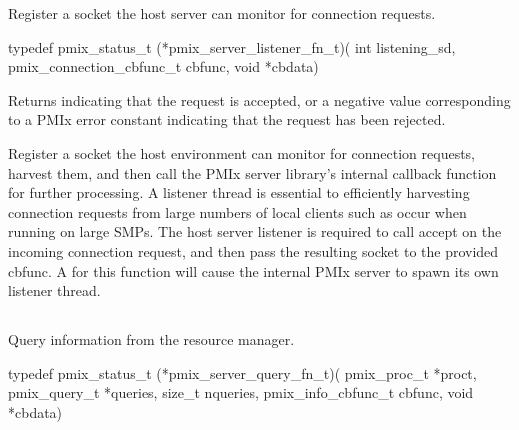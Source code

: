 \summary

Register a socket the host server can monitor for connection requests.

\format

\cspecificstart
\begin{codepar}
typedef pmix_status_t (*pmix_server_listener_fn_t)(
                             int listening_sd,
                             pmix_connection_cbfunc_t cbfunc,
                             void *cbdata)
\end{codepar}
\cspecificend

\begin{arglist}
\end{arglist}

Returns  indicating that the request is accepted, or a negative value corresponding to a PMIx error constant indicating that the request has been rejected.

\descr

Register a socket the host environment can monitor for connection requests, harvest them, and then call the \ac{PMIx} server library's internal callback function for further processing.
A listener thread is essential to efficiently harvesting connection requests from large numbers of local clients such as occur when running on large SMPs.
The host server listener is required to call accept on the incoming connection request, and then pass the resulting socket to the provided cbfunc.
A  for this function will cause the internal \ac{PMIx} server to spawn its own listener thread.


\subsection{}

\summary

Query information from the resource manager.

\format

\cspecificstart
\begin{codepar}
typedef pmix_status_t (*pmix_server_query_fn_t)(
                             pmix_proc_t *proct,
                             pmix_query_t *queries, size_t nqueries,
                             pmix_info_cbfunc_t cbfunc,
                             void *cbdata)
\end{codepar}
\cspecificend

